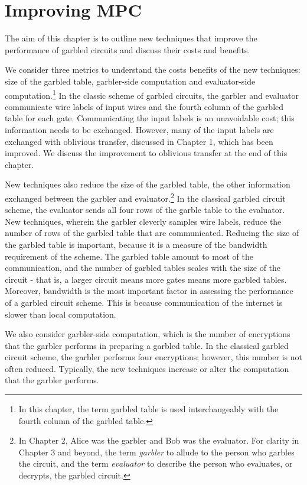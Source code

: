 
\chapter{Improving MPC}

The aim of this chapter is to outline new techniques that improve the performance of garbled circuits and discuss their costs and benefits.

We consider three metrics to understand the costs benefits of the new techniques: size of the garbled table, garbler-side computation and evaluator-side computation.\footnote{In this chapter, the term garbled table is used interchangeably with the fourth column of the garbled table.}
In the classic scheme of garbled circuits, the garbler and evaluator communicate wire labels of input wires and the fourth column of the garbled table for each gate.
Communicating the input labels is an unavoidable cost; this information needs to be exchanged. 
However, many of the input labels are exchanged with oblivious transfer, discussed in Chapter 1, which has been improved.
We discuss the improvement to oblivious transfer at the end of this chapter.

New techniques also reduce the size of the garbled table, the other information exchanged between the garbler and evaluator.\footnote{In Chapter 2, Alice was the garbler and Bob was the evaluator. For clarity in Chapter 3 and beyond, the term \textit{garbler} to allude to the person who garbles the circuit, and the term \textit{evaluator} to describe the person who evaluates, or decrypts, the garbled circuit.}
In the classical garbled circuit scheme, the evaluator sends all four rows of the garble table to the evaluator.
New techniques, wherein the garbler cleverly samples wire labels, reduce the number of rows of the garbled table that are communicated.
Reducing the size of the garbled table is important, because it is a measure of the bandwidth requirement of the scheme.
The garbled table amount to most of the communication, and the number of garbled tables scales with the size of the circuit - that is, a larger circuit means more gates means more garbled tables.
Moreover, bandwidth is the most important factor in assessing the performance of a garbled circuit scheme.
This is because communication of the internet is slower than local computation.

We also consider garbler-side computation, which is the number of encryptions that the garbler performs in preparing a garbled table.
In the classical garbled circuit scheme, the garbler performs four encryptions; however, this number is not often reduced.
Typically, the new techniques increase or alter the computation that the garbler performs.

